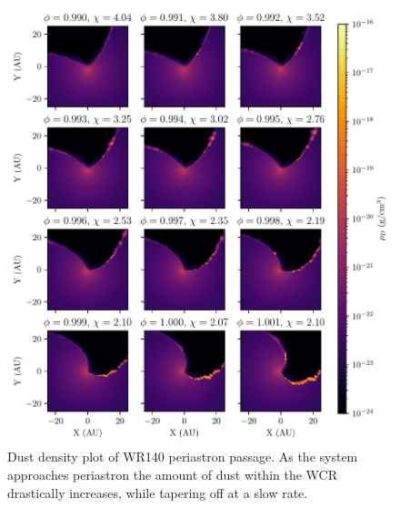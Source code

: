 \begin{figure}[p]
  \centering
  \includegraphics{assets/wr140-periastron/periastron-rhod.pdf}
  \caption[Dust density plot of WR140 periastron passage]{Dust density plot of WR140 periastron passage. As the system approaches periastron the amount of dust within the WCR drastically increases, while tapering off at a slow rate.}
\end{figure}